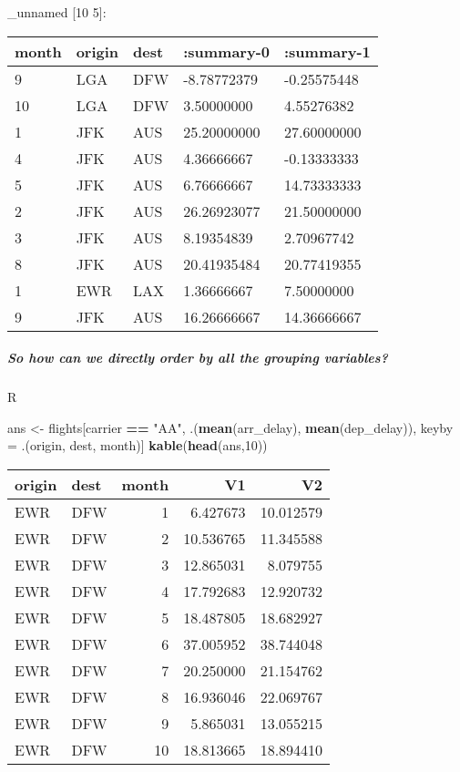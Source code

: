 \documentclass[]{article}
\newenvironment{Shaded}{\begin{snugshade}}{\end{snugshade}}
\newcommand{\DecValTok}[1]{\textcolor[rgb]{0.00,0.00,0.81}{#1}}
\newcommand{\KeywordTok}[1]{\textcolor[rgb]{0.13,0.29,0.53}{\textbf{#1}}}
\newcommand{\NormalTok}[1]{#1}
\newcommand{\OperatorTok}[1]{\textcolor[rgb]{0.81,0.36,0.00}{\textbf{#1}}}
\newcommand{\StringTok}[1]{\textcolor[rgb]{0.31,0.60,0.02}{#1}}
\let\oldsubparagraph\subparagraph
\renewcommand{\subparagraph}[1]{\oldsubparagraph{#1}\mbox{}}
\begin{document}
\_unnamed {[}10 5{]}:

\begin{longtable}[]{@{}lllll@{}}
\toprule
month & origin & dest & :summary-0 & :summary-1\tabularnewline
\midrule
\endhead
9 & LGA & DFW & -8.78772379 & -0.25575448\tabularnewline
10 & LGA & DFW & 3.50000000 & 4.55276382\tabularnewline
1 & JFK & AUS & 25.20000000 & 27.60000000\tabularnewline
4 & JFK & AUS & 4.36666667 & -0.13333333\tabularnewline
5 & JFK & AUS & 6.76666667 & 14.73333333\tabularnewline
2 & JFK & AUS & 26.26923077 & 21.50000000\tabularnewline
3 & JFK & AUS & 8.19354839 & 2.70967742\tabularnewline
8 & JFK & AUS & 20.41935484 & 20.77419355\tabularnewline
1 & EWR & LAX & 1.36666667 & 7.50000000\tabularnewline
9 & JFK & AUS & 16.26666667 & 14.36666667\tabularnewline
\bottomrule
\end{longtable}

\hypertarget{so-how-can-we-directly-order-by-all-the-grouping-variables}{%
\subparagraph{So how can we directly order by all the grouping
variables?}\label{so-how-can-we-directly-order-by-all-the-grouping-variables}}

R

\begin{Shaded}
\begin{Highlighting}[]
\NormalTok{ans <-}\StringTok{ }\NormalTok{flights[carrier }\OperatorTok{==}\StringTok{ "AA"}\NormalTok{,}
\NormalTok{        .(}\KeywordTok{mean}\NormalTok{(arr_delay), }\KeywordTok{mean}\NormalTok{(dep_delay)),}
\NormalTok{        keyby =}\StringTok{ }\NormalTok{.(origin, dest, month)]}
\KeywordTok{kable}\NormalTok{(}\KeywordTok{head}\NormalTok{(ans,}\DecValTok{10}\NormalTok{))}
\end{Highlighting}
\end{Shaded}

\begin{longtable}[]{@{}llrrr@{}}
\toprule
origin & dest & month & V1 & V2\tabularnewline
\midrule
\endhead
EWR & DFW & 1 & 6.427673 & 10.012579\tabularnewline
EWR & DFW & 2 & 10.536765 & 11.345588\tabularnewline
EWR & DFW & 3 & 12.865031 & 8.079755\tabularnewline
EWR & DFW & 4 & 17.792683 & 12.920732\tabularnewline
EWR & DFW & 5 & 18.487805 & 18.682927\tabularnewline
EWR & DFW & 6 & 37.005952 & 38.744048\tabularnewline
EWR & DFW & 7 & 20.250000 & 21.154762\tabularnewline
EWR & DFW & 8 & 16.936046 & 22.069767\tabularnewline
EWR & DFW & 9 & 5.865031 & 13.055215\tabularnewline
EWR & DFW & 10 & 18.813665 & 18.894410\tabularnewline
\bottomrule
\end{longtable}
\end{document}
